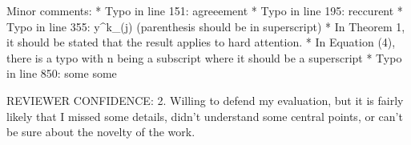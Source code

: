 \documentclass[11pt,a4paper]{article}
\begin{document}
Minor comments:
* Typo in line 151: agreeement
* Typo in line 195: reccurent
* Typo in line 355: y^k_(j) (parenthesis should be in superscript)
* In Theorem 1, it should be stated that the result applies to hard
attention.
* In Equation (4), there is a typo with n being a subscript where it should
be a superscript
* Typo in line 850: some some

REVIEWER CONFIDENCE:
        2. Willing to defend my evaluation, but it is fairly likely that I missed
some details, didn't understand some central points, or can't be sure about
the novelty of the work.
\end{document}
